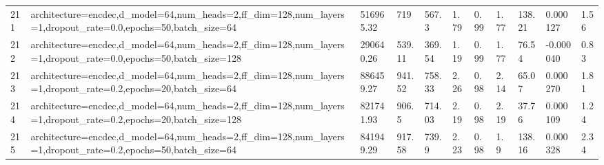 \begin{longtable}{C{0.8cm} L{2cm} C{1.15cm} C{1.15cm} C{1.15cm} C{1.15cm} C{0.85cm} C{1.25cm} C{1.2cm} C{1.5cm} C{1.0cm}}
211 & architecture=encdec,\newline d\_model=64,\newline num\_heads=2,\newline ff\_dim=128,\newline num\_layers=1,\newline dropout\_rate=0.0,\newline epochs=50,\newline batch\_size=64 & 516965.32 & 719 & 567.3 & 1.79 & 0.99 & 1.77 & 138.21 & 0.000127 & 1.56 \\
212 & architecture=encdec,\newline d\_model=64,\newline num\_heads=2,\newline ff\_dim=128,\newline num\_layers=1,\newline dropout\_rate=0.0,\newline epochs=50,\newline batch\_size=128 & 290640.26 & 539.11 & 369.54 & 1.19 & 0.99 & 1.77 & 76.54 & -0.000040 & 0.83 \\
213 & architecture=encdec,\newline d\_model=64,\newline num\_heads=2,\newline ff\_dim=128,\newline num\_layers=1,\newline dropout\_rate=0.2,\newline epochs=20,\newline batch\_size=64 & 886459.27 & 941.52 & 758.33 & 2.26 & 0.98 & 2.14 & 65.07 & 0.000270 & 1.81 \\
214 & architecture=encdec,\newline d\_model=64,\newline num\_heads=2,\newline ff\_dim=128,\newline num\_layers=1,\newline dropout\_rate=0.2,\newline epochs=20,\newline batch\_size=128 & 821741.93 & 906.5 & 714.03 & 2.19 & 0.98 & 2.19 & 37.76 & 0.000109 & 1.24 \\
215 & architecture=encdec,\newline d\_model=64,\newline num\_heads=2,\newline ff\_dim=128,\newline num\_layers=1,\newline dropout\_rate=0.2,\newline epochs=50,\newline batch\_size=64 & 841949.29 & 917.58 & 739.9 & 2.23 & 0.98 & 1.9 & 138.16 & 0.000328 & 2.34 \\

\end{longtable}
